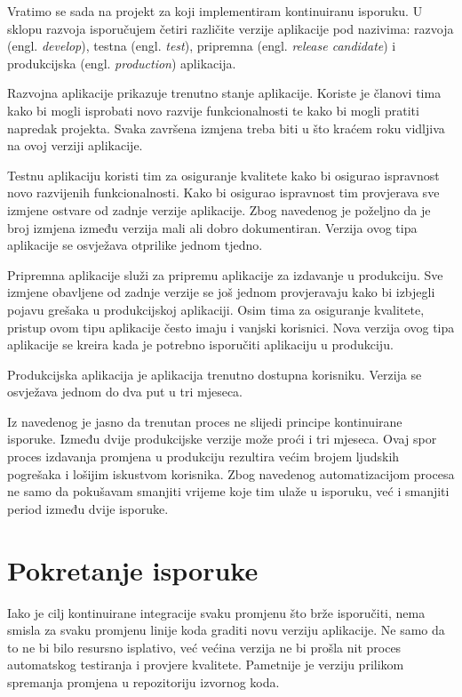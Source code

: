 \documentclass[times, utf8, diplomski, numeric]{fer}
\newcommand{\eng}[1]{(engl. \textit{#1})}
\begin{document}
Vratimo se sada na projekt za koji implementiram kontinuiranu isporuku. U sklopu razvoja isporučujem četiri različite verzije aplikacije pod nazivima: razvoja \eng{develop}, testna \eng{test}, pripremna \eng{release candidate} i produkcijska \eng{production} aplikacija.

Razvojna aplikacije prikazuje trenutno stanje aplikacije. Koriste je članovi tima kako bi mogli isprobati novo razvije funkcionalnosti te kako bi mogli pratiti napredak projekta. Svaka završena izmjena treba biti u što kraćem roku vidljiva na ovoj verziji aplikacije.

Testnu aplikaciju koristi tim za osiguranje kvalitete kako bi osigurao ispravnost novo razvijenih funkcionalnosti. Kako bi osigurao ispravnost tim provjerava sve izmjene ostvare od zadnje verzije aplikacije. Zbog navedenog je poželjno da je broj izmjena između verzija mali ali dobro dokumentiran. Verzija ovog tipa aplikacije se osvježava otprilike jednom tjedno.

Pripremna aplikacije služi za pripremu aplikacije za izdavanje u produkciju. Sve izmjene obavljene od zadnje verzije se još jednom provjeravaju kako bi izbjegli pojavu grešaka u produkcijskoj aplikaciji. Osim tima za osiguranje kvalitete, pristup ovom tipu aplikacije često imaju i vanjski korisnici. Nova verzija ovog tipa aplikacije se kreira kada je potrebno isporučiti aplikaciju u produkciju.

Produkcijska aplikacija je aplikacija trenutno dostupna korisniku. Verzija se osvježava jednom do dva put u tri mjeseca.

Iz navedenog je jasno da trenutan proces ne slijedi principe kontinuirane isporuke. Između dvije produkcijske verzije može proći i tri mjeseca. Ovaj spor proces izdavanja promjena u produkciju rezultira većim brojem ljudskih pogrešaka i lošijim iskustvom korisnika. Zbog navedenog automatizacijom procesa ne samo da pokušavam smanjiti vrijeme koje tim ulaže u isporuku, već i smanjiti period između dvije isporuke.


\section{Pokretanje isporuke}

Iako je cilj kontinuirane integracije svaku promjenu što brže isporučiti, nema smisla za svaku promjenu linije koda graditi novu verziju aplikacije. Ne samo da to ne bi bilo resursno isplativo, već većina verzija ne bi prošla nit proces automatskog testiranja i provjere kvalitete. Pametnije je verziju prilikom spremanja promjena u repozitoriju izvornog koda.
\end{document}
